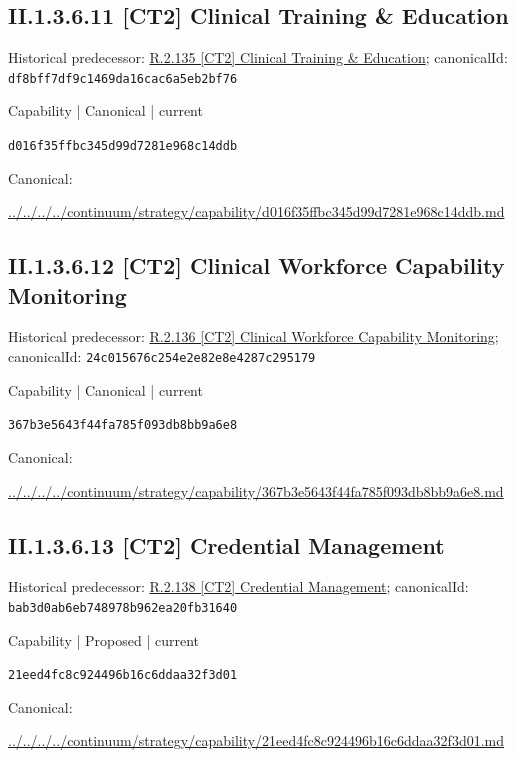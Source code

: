 \documentclass[10pt,a4paper]{article}
\begin{document}
\subsection*{II.1.3.6.11 [CT2] Clinical Training \& Education}
Historical predecessor: \hyperref[element-df8bff7df9c1469da16cac6a5eb2bf76]{R.2.135 [CT2] Clinical Training \& Education}; canonicalId: \texttt{df8bff7df9c1469da16cac6a5eb2bf76}\par
\label{element-d016f35ffbc345d99d7281e968c14ddb}
{\small Capability | Canonical | current}\par
\texttt{d016f35ffbc345d99d7281e968c14ddb}\par
Canonical: \par
{\footnotesize\url{../../../../continuum/strategy/capability/d016f35ffbc345d99d7281e968c14ddb.md}}\par
\subsection*{II.1.3.6.12 [CT2] Clinical Workforce Capability Monitoring}
Historical predecessor: \hyperref[element-24c015676c254e2e82e8e4287c295179]{R.2.136 [CT2] Clinical Workforce Capability Monitoring}; canonicalId: \texttt{24c015676c254e2e82e8e4287c295179}\par
\label{element-367b3e5643f44fa785f093db8bb9a6e8}
{\small Capability | Canonical | current}\par
\texttt{367b3e5643f44fa785f093db8bb9a6e8}\par
Canonical: \par
{\footnotesize\url{../../../../continuum/strategy/capability/367b3e5643f44fa785f093db8bb9a6e8.md}}\par
\subsection*{II.1.3.6.13 [CT2] Credential Management}
Historical predecessor: \hyperref[element-bab3d0ab6eb748978b962ea20fb31640]{R.2.138 [CT2] Credential Management}; canonicalId: \texttt{bab3d0ab6eb748978b962ea20fb31640}\par
\label{element-21eed4fc8c924496b16c6ddaa32f3d01}
{\small Capability | Proposed | current}\par
\texttt{21eed4fc8c924496b16c6ddaa32f3d01}\par
Canonical: \par
{\footnotesize\url{../../../../continuum/strategy/capability/21eed4fc8c924496b16c6ddaa32f3d01.md}}\par
\end{document}
